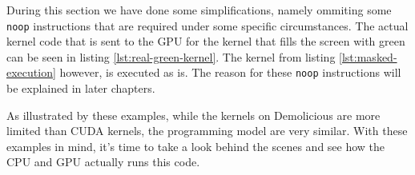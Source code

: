 \documentclass[../main/report.tex]{subfiles}
\begin{document}
During this section we have done some simplifications, namely ommiting some \verb/noop/ instructions that are required under some specific circumstances. 
The actual kernel code that is sent to the GPU for the kernel that fills the screen with green can be seen in listing \ref{lst:real-green-kernel}. The kernel from listing \ref{lst:masked-execution} however, is executed as is. The reason for these \verb/noop/ instructions will be explained in later chapters.


As illustrated by these examples, while the kernels on Demolicious are more limited than CUDA kernels, the programming model are very similar.
With these examples in mind, it's time to take a look behind the scenes and see how the CPU and GPU actually runs this code.




\end{document}
